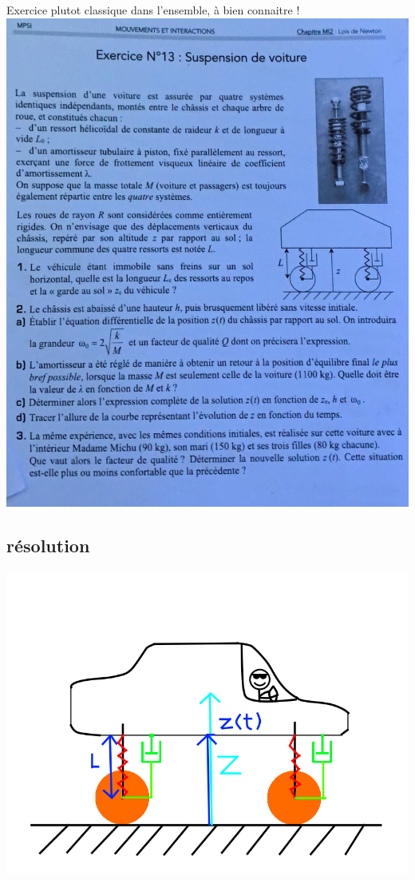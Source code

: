 \documentclass{article}
\begin{document}
Exercice plutot classique dans l'ensemble, à bien connaitre ! \\

\includegraphics[scale=0.4]{assets/physique/kholle8-1.png} \\

\subsection{résolution}

\includegraphics[scale=0.4]{assets/physique/kholle8-2.png}
\end{document}
